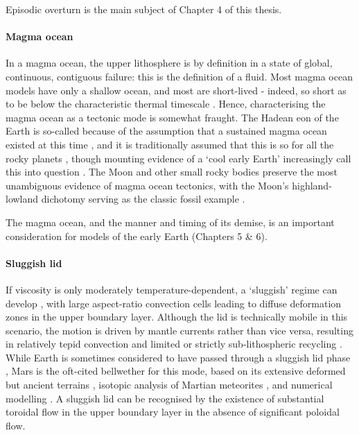 \documentclass[a4paper,11pt,oneside]{book}
\begin{document}
Episodic overturn is the main subject of Chapter 4 of this thesis.

\paragraph{Magma ocean}

In a magma ocean, the upper lithosphere is by definition in a state of global, continuous, contiguous failure: this is the definition of a fluid. Most magma ocean models have only a shallow ocean, and most are short-lived - indeed, so short as to be below the characteristic thermal timescale \cite{Andrault2011-sz}. Hence, characterising the magma ocean as a tectonic mode is somewhat fraught. The Hadean eon of the Earth is so-called because of the assumption that a sustained magma ocean existed at this time \cite{Abe1993-pn}, and it is traditionally assumed that this is so for all the rocky planets \cite{Schaefer2018-hq}, though mounting evidence of a `cool early Earth' increasingly call this into question \citet{Valley2005-sv, Kenny2016-pw}. The Moon and other small rocky bodies preserve the most unambiguous evidence of magma ocean tectonics, with the Moon's highland-lowland dichotomy serving as the classic fossil example \citet{Warren1985-rw, Elkins_Tanton2002-ib, Elardo2011-ou, Elkins-Tanton2011-ao, Ogawa2018-kt}.

The magma ocean, and the manner and timing of its demise, is an important consideration for models of the early Earth (Chapters 5 \& 6).

\paragraph{Sluggish lid}

If viscosity is only moderately temperature-dependent, a `sluggish' regime can develop \cite{Solomatov1995-is}, with large aspect-ratio convection cells leading to diffuse deformation zones in the upper boundary layer. Although the lid is technically mobile in this scenario, the motion is driven by mantle currents rather than vice versa, resulting in relatively tepid convection \cite{Bercovici2000-on} and limited or strictly sub-lithospheric recycling \cite{Beall2017-jr}. While Earth is sometimes considered to have passed through a sluggish lid phase \cite{Foley2018-dy}, Mars is the oft-cited bellwether for this mode, based on its extensive deformed but ancient terrains \cite{Banerdt1992-ic}, isotopic analysis of Martian meteorites \cite{Debaille2009-ns}, and numerical modelling \cite{Kiefer2003-at}. A sluggish lid can be recognised by the existence of substantial toroidal flow in the upper boundary layer in the absence of significant poloidal flow.
\end{document}
